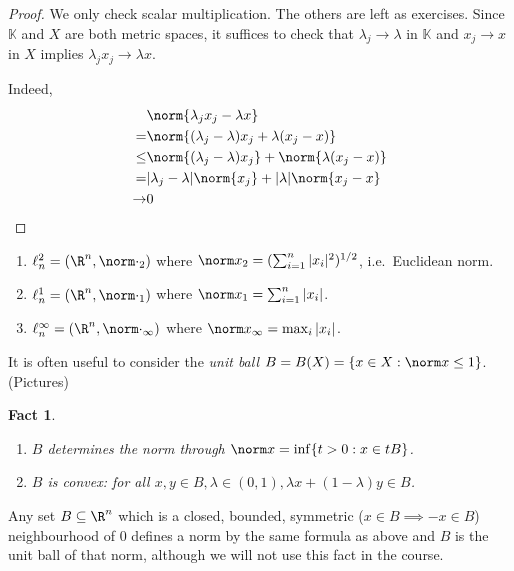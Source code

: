 \documentclass[a4paper]{article}
\newtheorem*{fact}{Fact}
\newcommand{\K}{{\mathbb{K}}} %
\begin{document}
\begin{proof}
  We only check scalar multiplication. The others are left as exercises. Since \(\K\) and \(X\) are both metric spaces, it suffices to check that \(\lambda_j \to \lambda\) in \(\K\) and \(x_j \to x\) in \(X\) implies \(\lambda_j x_j \to \lambda x\).

  Indeed,
  \begin{align*}
    &\norm{\lambda_j x_j - \lambda x} \\
    =& \norm{(\lambda_j - \lambda) x_j + \lambda(x_j - x)} \\
    \leq& \norm{(\lambda_j - \lambda) x_j} + \norm{\lambda(x_j - x)} \\
    =& |\lambda_j - \lambda| \norm{x_j} +|\lambda| \norm{x_j - x} \\
    \to& 0
  \end{align*}
\end{proof}

\begin{eg}\leavevmode
  \begin{enumerate}
  \item \(\ell_n^2 = (\R^n, \norm \cdot_2)\) where \(\norm x_2 = (\sum_{i = 1}^n |x_i|^2)^{1/2}\), i.e.\ Euclidean norm.
  \item \(\ell_n^1 = (\R^n, \norm \cdot_1)\) where \(\norm x_1 = \sum_{i = 1}^n |x_i|\).
  \item \(\ell_n^\infty = (\R^n, \norm \cdot_\infty)\) where \(\norm x_\infty = \max_i |x_i|\).
  \end{enumerate}
\end{eg}

It is often useful to consider the \emph{unit ball} \(B = B(X) = \{x \in X: \norm x \leq 1\}\). (Pictures)

\begin{fact}\leavevmode
\begin{enumerate}
\item \(B\) determines the norm through \(\norm x = \inf \{t > 0: x \in tB\}\).
\item \(B\) is \emph{convex}: for all \(x, y \in B, \lambda \in (0, 1), \lambda x + (1 - \lambda) y \in B\).
\end{enumerate}
\end{fact}

\begin{remark}
  Any set \(B \subseteq \R^n\) which is a closed, bounded, symmetric (\(x \in B \implies -x \in B\)) neighbourhood of \(0\) defines a norm by the same formula as above and \(B\) is the unit ball of that norm, although we will not use this fact in the course.
\end{remark}
\end{document}
